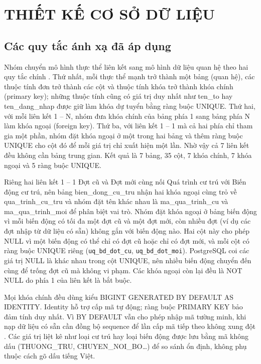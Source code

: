 \section{THIẾT KẾ CƠ SỞ DỮ LIỆU}
\label{sec:chuong3}

\subsection{Các quy tắc ánh xạ đã áp dụng}
\label{subsec:anhxa}

Nhóm chuyển mô hình thực thể liên kết sang mô hình dữ liệu quan hệ theo hai quy tắc chính \cite{elmasri,silberschatz}. Thứ nhất, mỗi thực thể mạnh trở thành một bảng (quan hệ), các thuộc tính đơn trở thành các cột và thuộc tính khóa trở thành khóa chính (primary key); những thuộc tính cũng có giá trị duy nhất như ten\_to hay ten\_dang\_nhap được giữ làm khóa dự tuyển bằng ràng buộc UNIQUE. Thứ hai, với mỗi liên kết 1 -- N, nhóm đưa khóa chính của bảng phía 1 sang bảng phía N làm khóa ngoại (foreign key). Thứ ba, với liên kết 1 -- 1 mà cả hai phía chỉ tham gia một phần, nhóm đặt khóa ngoại ở một trong hai bảng và thêm ràng buộc UNIQUE cho cột đó để mỗi giá trị chỉ xuất hiện một lần. Nhờ vậy cả 7 liên kết đều không cần bảng trung gian. Kết quả là 7 bảng, 35 cột, 7 khóa chính, 7 khóa ngoại và 5 ràng buộc UNIQUE.

Riêng hai liên kết 1 -- 1 Đợt cũ và Đợt mới cùng nối Quá trình cư trú với Biến động cư trú, nên bảng bien\_dong\_cu\_tru nhận hai khóa ngoại cùng trỏ về qua\_trinh\_cu\_tru và nhóm đặt tên khác nhau là ma\_qua\_trinh\_cu và ma\_qua\_trinh\_moi để phân biệt vai trò. Nhóm đặt khóa ngoại ở bảng biến động vì mỗi biến động có tối đa một đợt cũ và một đợt mới, còn nhiều đợt (ví dụ các đợt nhập từ dữ liệu có sẵn) không gắn với biến động nào. Hai cột này cho phép NULL vì một biến động có thể chỉ có đợt cũ hoặc chỉ có đợt mới, và mỗi cột có ràng buộc UNIQUE riêng (\texttt{uq\_bd\_dot\_cu}, \texttt{uq\_bd\_dot\_moi}). PostgreSQL coi các giá trị NULL là khác nhau trong cột UNIQUE, nên nhiều biến động chuyển đến cùng để trống đợt cũ mà không vi phạm. Các khóa ngoại còn lại đều là NOT NULL do phía 1 của liên kết là bắt buộc.

Mọi khóa chính đều dùng kiểu BIGINT GENERATED BY DEFAULT AS IDENTITY. Identity hỗ trợ cấp mã tự động; ràng buộc PRIMARY KEY bảo đảm tính duy nhất. Vì BY DEFAULT vẫn cho phép nhập mã tường minh, khi nạp dữ liệu có sẵn cần đồng bộ sequence để lần cấp mã tiếp theo không xung đột \cite{pgidentity}. Các giá trị liệt kê như loại cư trú hay loại biến động được lưu bằng mã không dấu (THUONG\_TRU, CHUYEN\_NOI\_BO\ldots) để so sánh ổn định, không phụ thuộc cách gõ dấu tiếng Việt.

